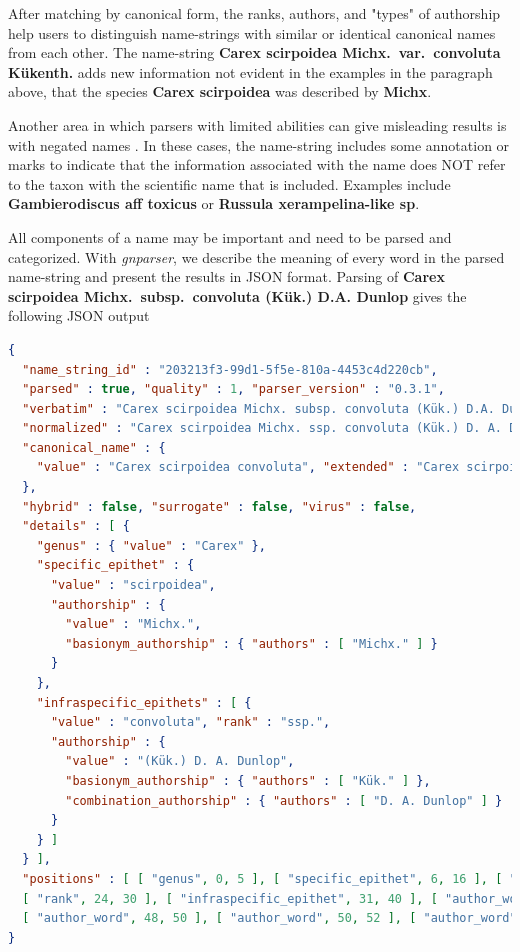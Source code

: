 \documentclass{bmcart}
\begin{document}
After matching by canonical form, the ranks, authors, and "types" of authorship
help users to distinguish name-strings with similar or identical canonical
names from each other. The name-string \textbf{Carex scirpoidea Michx.\ var.\
  convoluta Kükenth.} adds new information not evident in the examples in the
paragraph above, that the species \textbf{Carex scirpoidea} was described by
\textbf{Michx}.

Another area in which parsers with limited abilities can give misleading
results is with negated names \cite{Patterson2016}. In these cases, the
name-string includes some annotation or marks to indicate that the information
associated with the name does NOT refer to the taxon with the scientific name
that is included. Examples include \textbf{Gambierodiscus aff toxicus} or
\textbf{Russula xerampelina-like sp}.

All components of a name may be important and need to be parsed and
categorized. With \textit{gnparser}, we describe the meaning of every word in
the parsed name-string and present the results in JSON format. Parsing of
\textbf{Carex scirpoidea Michx.\ subsp.\ convoluta (Kük.) D.A. Dunlop} gives
the following JSON output

\vspace{0.1cm}

\begin{lstlisting}[language=json]
{
  "name_string_id" : "203213f3-99d1-5f5e-810a-4453c4d220cb",
  "parsed" : true, "quality" : 1, "parser_version" : "0.3.1",
  "verbatim" : "Carex scirpoidea Michx. subsp. convoluta (Kük.) D.A. Dunlop",
  "normalized" : "Carex scirpoidea Michx. ssp. convoluta (Kük.) D. A. Dunlop",
  "canonical_name" : {
    "value" : "Carex scirpoidea convoluta", "extended" : "Carex scirpoidea ssp. convoluta"
  },
  "hybrid" : false, "surrogate" : false, "virus" : false,
  "details" : [ {
    "genus" : { "value" : "Carex" },
    "specific_epithet" : {
      "value" : "scirpoidea",
      "authorship" : {
        "value" : "Michx.",
        "basionym_authorship" : { "authors" : [ "Michx." ] }
      }
    },
    "infraspecific_epithets" : [ {
      "value" : "convoluta", "rank" : "ssp.",
      "authorship" : {
        "value" : "(Kük.) D. A. Dunlop",
        "basionym_authorship" : { "authors" : [ "Kük." ] },
        "combination_authorship" : { "authors" : [ "D. A. Dunlop" ] }
      }
    } ]
  } ],
  "positions" : [ [ "genus", 0, 5 ], [ "specific_epithet", 6, 16 ], [ "author_word", 17, 23 ],
  [ "rank", 24, 30 ], [ "infraspecific_epithet", 31, 40 ], [ "author_word", 42, 46 ],
  [ "author_word", 48, 50 ], [ "author_word", 50, 52 ], [ "author_word", 53, 59 ] ]
}
\end{lstlisting}
\end{document}
